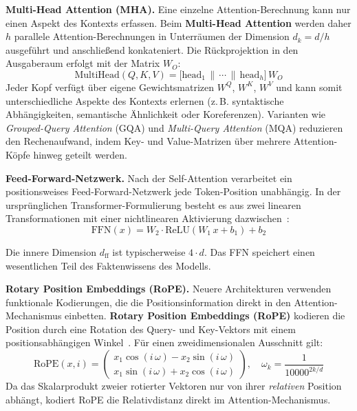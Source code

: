 \textbf{Multi-Head Attention (MHA).}
Eine einzelne Attention-Berechnung kann nur einen Aspekt des Kontexts erfassen. Beim \textbf{Multi-Head Attention} werden daher $h$ parallele
Attention-Berechnungen in Unterräumen der Dimension $d_k = d/h$
ausgeführt und anschließend konkateniert. Die Rückprojektion in den Ausgaberaum erfolgt mit der Matrix $W_O$:
\begin{equation}
    \text{MultiHead}(Q,K,V) = \bigl[\text{head}_1 \,\|\, \cdots \,\|\, \text{head}_h\bigr]\,W_O
    \label{eq:multihead}
\end{equation}
Jeder Kopf verfügt über eigene Gewichtsmatrizen $W^Q$, $W^K$, $W^V$ und kann somit unterschiedliche Aspekte des Kontexts erlernen
(z.\,B. syntaktische Abhängigkeiten, semantische Ähnlichkeit oder Koreferenzen). Varianten wie \textit{Grouped-Query Attention} (GQA) und \textit{Multi-Query Attention} (MQA) reduzieren den Rechenaufwand, indem Key- und Value-Matrizen über mehrere Attention-Köpfe hinweg geteilt werden.

\textbf{Feed-Forward-Netzwerk.}\label{sec:mlp}
Nach der Self-Attention verarbeitet ein positionsweises
Feed-Forward-Netzwerk jede Token-Position unabhängig.
In der ursprünglichen Transformer-Formulierung besteht es aus zwei
linearen Transformationen mit einer nichtlinearen Aktivierung
dazwischen~\cite{vaswani_attention}:
\begin{equation}
    \text{FFN}(x) = W_2 \cdot \text{ReLU}(W_1\,x + b_1) + b_2
    \label{eq:ffn_relu}
\end{equation}

Die innere Dimension $d_{\text{ff}}$ ist typischerweise $4 \cdot d$.
Das FFN speichert einen wesentlichen Teil des Faktenwissens des Modells.

\textbf{Rotary Position Embeddings (RoPE).}
Neuere Architekturen verwenden funktionale Kodierungen, die die
Positionsinformation direkt in den Attention-Mechanismus einbetten.
\textbf{Rotary Position Embeddings (RoPE)} kodieren die Position durch
eine Rotation des Query- und Key-Vektors mit einem positionsabhängigen
Winkel~\cite{su_rope}. Für einen zweidimensionalen Ausschnitt gilt:
\begin{equation}
    \text{RoPE}(x, i) =
    \begin{pmatrix}
        x_1 \cos(i\,\omega) - x_2 \sin(i\,\omega) \\
        x_1 \sin(i\,\omega) + x_2 \cos(i\,\omega)
    \end{pmatrix},
    \quad \omega_k = \frac{1}{10000^{2k/d}}
    \label{eq:rope}
\end{equation}
Da das Skalarprodukt zweier rotierter Vektoren nur von ihrer
\emph{relativen} Position abhängt, kodiert RoPE die Relativdistanz
direkt im Attention-Mechanismus.

